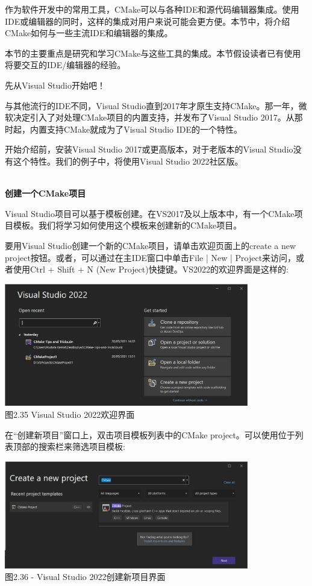 
作为软件开发中的常用工具，CMake可以与各种IDE和源代码编辑器集成。使用IDE或编辑器的同时，这样的集成对用户来说可能会更方便。本节中，将介绍CMake如何与一些主流IDE和编辑器的集成。

本节的主要重点是研究和学习CMake与这些工具的集成。本节假设读者已有使用将要交互的IDE/编辑器的经验。

先从Visual Studio开始吧！


与其他流行的IDE不同，Visual Studio直到2017年才原生支持CMake。那一年，微软决定引入了对处理CMake项目的内置支持，并发布了Visual Studio 2017。从那时起，内置支持CMake就成为了Visual Studio IDE的一个特性。

开始介绍前，安装Visual Studio 2017或更高版本，对于老版本的Visual Studio没有这个特性。我们的例子中，将使用Visual Studio 2022社区版。

\hspace*{\fill} \\ %
\noindent
\textbf{创建一个CMake项目}

Visual Studio项目可以基于模板创建。在VS2017及以上版本中，有一个CMake项目模板。我们将学习如何使用这个模板来创建新的CMake项目。

要用Visual Studio创建一个新的CMake项目，请单击欢迎页面上的create a new project按钮。或者，可以通过在主IDE窗口中单击File | New | Project来访问，或者使用Ctrl + Shift + N (New Project)快捷键。VS2022的欢迎界面是这样的:

\begin{center}
\includegraphics[width=0.8\textwidth]{content/1/chapter2/images/35.jpg}\\
图2.35 Visual Studio 2022欢迎界面
\end{center}

在“创建新项目”窗口上，双击项目模板列表中的CMake project。可以使用位于列表顶部的搜索栏来筛选项目模板:

\begin{center}
\includegraphics[width=0.8\textwidth]{content/1/chapter2/images/36.jpg}\\
图2.36 - Visual Studio 2022创建新项目界面
\end{center}

